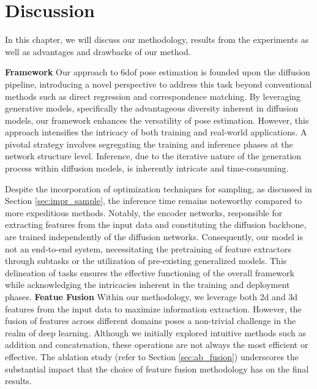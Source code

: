 \documentclass[12pt,DIV14,BCOR12mm,a4paper,footinclude=false,headinclude,parskip=half-,twoside,openright,cleardoublepage=empty,toc=index,bibliography=totoc,listof=totoc]{scrreprt}
\numberwithin{equation}{chapter}
\begin{document}
\chapter{Discussion}
In this chapter, we will discuss our methodology, results from the experiments as well as advantages and drawbacks of our method.

\textbf{Framework} \quad Our approach to \gls{6dof} pose estimation is founded upon the diffusion pipeline, introducing a novel perspective to address this task beyond conventional methods such as direct regression and correspondence matching. By leveraging generative models, specifically the advantageous diversity inherent in diffusion models, our framework enhances the versatility of pose estimation. However, this approach intensifies the intricacy of both training and real-world applications. A pivotal strategy involves segregating the training and inference phases at the network structure level. Inference, due to the iterative nature of the generation process within diffusion models, is inherently intricate and time-consuming.

Despite the incorporation of optimization techniques for sampling, as discussed in Section \ref{sec:impr_sample}, the inference time remains noteworthy compared to more expeditious methods. Notably, the encoder networks, responsible for extracting features from the input data and constituting the diffusion backbone, are trained independently of the diffusion networks. Consequently, our model is not an end-to-end system, necessitating the pretraining of feature extractors through subtasks or the utilization of pre-existing generalized models. This delineation of tasks ensures the effective functioning of the overall framework while acknowledging the intricacies inherent in the training and deployment phases.
\bigbreak
\textbf{Featue Fusion} \quad Within our methodology, we leverage both \gls{2d} and \gls{3d} features from the input data to maximize information extraction. However, the fusion of features across different domains poses a non-trivial challenge in the realm of deep learning. Although we initially explored intuitive methods such as addition and concatenation, these operations are not always the most efficient or effective. The ablation study (refer to Section \ref{sec:ab_fusion}) underscores the substantial impact that the choice of feature fusion methodology has on the final results.
\end{document}
